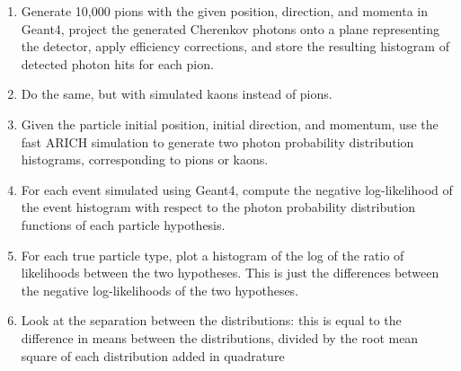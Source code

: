 \begin{enumerate}
\item Generate 10,000 pions with the given position, direction, and momenta in Geant4, project the generated Cherenkov photons onto a plane representing the detector, apply efficiency corrections, and store the resulting histogram of detected photon hits for each pion. 
\item Do the same, but with simulated kaons instead of pions.
\item Given the particle initial position, initial direction, and momentum, use the fast ARICH simulation to generate two photon probability distribution histograms, corresponding to pions or kaons.
\item For each event simulated using Geant4, compute the negative log-likelihood of the event histogram with respect to the photon probability distribution functions of each particle hypothesis.
\item For each true particle type, plot a histogram of the log of the ratio of likelihoods between the two hypotheses.
This is just the differences between the negative log-likelihoods of the two hypotheses.
\item Look at the separation between the distributions: this is equal to the difference in means between the distributions, divided by the root mean square of each distribution added in quadrature
\end{enumerate}


